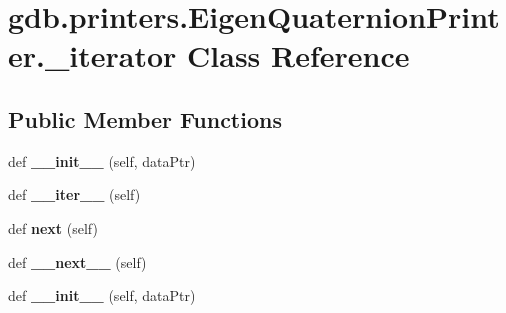 \hypertarget{classgdb_1_1printers_1_1_eigen_quaternion_printer_1_1__iterator}{}\section{gdb.\+printers.\+Eigen\+Quaternion\+Printer.\+\_\+iterator Class Reference}
\label{classgdb_1_1printers_1_1_eigen_quaternion_printer_1_1__iterator}
\subsection*{Public Member Functions}
\begin{DoxyCompactItemize}
\item 
\mbox{\label{classgdb_1_1printers_1_1_eigen_quaternion_printer_1_1__iterator_a901e8b717ca7b8ee1d74fedba9aed884}} 
def {\bfseries \+\_\+\+\_\+init\+\_\+\+\_\+} (self, data\+Ptr)
\item 
\mbox{\label{classgdb_1_1printers_1_1_eigen_quaternion_printer_1_1__iterator_ad09efbd4c101a1a920bd28a40f2c841c}} 
def {\bfseries \+\_\+\+\_\+iter\+\_\+\+\_\+} (self)
\item 
\mbox{\label{classgdb_1_1printers_1_1_eigen_quaternion_printer_1_1__iterator_a3ce4510fa0717a0d5fbd647f7d2a1918}} 
def {\bfseries next} (self)
\item 
\mbox{\label{classgdb_1_1printers_1_1_eigen_quaternion_printer_1_1__iterator_a11d582280237f3ba949db06c283cbd4d}} 
def {\bfseries \+\_\+\+\_\+next\+\_\+\+\_\+} (self)
\item 
\mbox{\label{classgdb_1_1printers_1_1_eigen_quaternion_printer_1_1__iterator_a901e8b717ca7b8ee1d74fedba9aed884}} 
def {\bfseries \+\_\+\+\_\+init\+\_\+\+\_\+} (self, data\+Ptr)
\item 
\mbox{\label{classgdb_1_1printers_1_1_eigen_quaternion_printer_1_1__iterator_ad09efbd4c101a1a920bd28a40f2c841c}} 

\end{DoxyCompactItemize}
